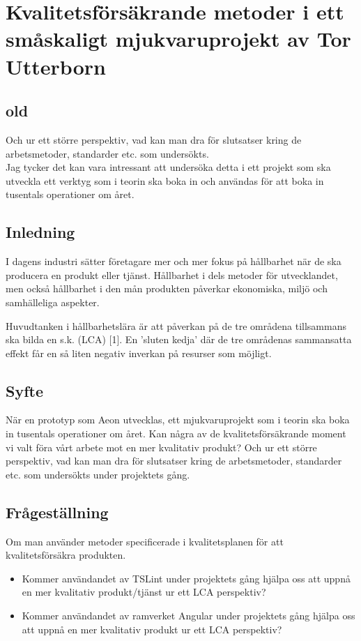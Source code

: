 \chapter{Kvalitetsförsäkrande metoder i ett småskaligt mjukvaruprojekt av Tor Utterborn}

\section{old}

Och ur ett större perspektiv, vad kan man dra för slutsatser kring de arbetsmetoder, standarder etc. som undersökts. \\

Jag tycker det kan vara intressant att undersöka detta i ett projekt som ska utveckla ett verktyg som i teorin ska boka in och användas för att boka in tusentals operationer om året.

\section{Inledning}
I dagens industri sätter företagare mer och mer fokus på hållbarhet när de ska producera en produkt eller tjänst. Hållbarhet i dels metoder för utvecklandet, men också hållbarhet i den mån produkten påverkar ekonomiska, miljö och samhälleliga aspekter.

Huvudtanken i hållbarhetslära är att påverkan på de tre områdena tillsammans ska bilda en s.k. (LCA) [1]. En ’sluten kedja’ där de tre områdenas sammansatta effekt får en så liten negativ inverkan på resurser som möjligt.

\section{Syfte}
När en prototyp som Aeon utvecklas, ett mjukvaruprojekt som i teorin ska boka in tusentals operationer om året. 
Kan några av de kvalitetsförsäkrande moment vi valt föra vårt arbete mot en mer kvalitativ produkt? Och ur ett större perspektiv, vad kan man dra för slutsatser kring de arbetsmetoder, standarder etc. som undersökts under projektets gång.

\section{Frågeställning}

Om man använder metoder specificerade i kvalitetsplanen för att kvalitetsförsäkra produkten. 

\begin{itemize}
	\item Kommer användandet av TSLint under projektets gång hjälpa oss att uppnå en mer kvalitativ produkt/tjänst ur ett LCA perspektiv?
	\item Kommer användandet av ramverket Angular under projektets gång hjälpa oss att uppnå en mer kvalitativ produkt ur ett LCA perspektiv?
\end{itemize}

